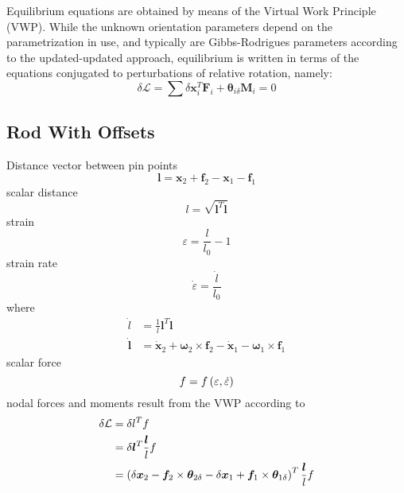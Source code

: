 \documentclass[10pt,fleqn,subeqn]{report}
\newcommand{\T}[1]{\bm{#1}}
\begin{document}
Equilibrium equations are obtained by means of the Virtual Work
Principle (VWP).
While the unknown orientation parameters depend on the parametrization 
in use, and typically are Gibbs-Rodrigues parameters according 
to the updated-updated approach, equilibrium is written in terms
of the equations conjugated to perturbations of relative rotation,
namely:
\begin{equation}
	\delta\mathcal{L} = \sum \delta\T{x}_i^T \T{F}_i
	+ \T{\theta}_{i\delta} \T{M}_i = 0
\end{equation}

\subsection{Rod With Offsets}
Distance vector between pin points
\begin{equation}
	\T{l} = \T{x}_2 + \T{f}_2 - \T{x}_1 - \T{f}_1
\end{equation}
scalar distance
\begin{equation}
	l = \sqrt{\T{l}^T \T{l}}
\end{equation}
strain
\begin{equation}
	\varepsilon = \frac{l}{l_0} - 1
\end{equation}
strain rate
\begin{equation}
	\dot{\varepsilon} = \frac{\dot{l}}{l_0}
\end{equation}
where
\begin{subequations}
\begin{align}
	\dot{l} &= \frac{1}{l} \T{l}^T \dot{\T{l}} \\
	\dot{\T{l}} &= \dot{\T{x}}_2 + \T{\omega}_2 \times \T{f}_2
		- \dot{\T{x}}_1 - \T{\omega}_1 \times \T{f}_1
\end{align}
\end{subequations}
scalar force
\begin{equation}
	f = f\left( \varepsilon, \dot{\varepsilon} \right)
\end{equation}
nodal forces and moments result from the VWP according to
\begin{subequations}
\begin{align}
	\delta \mathcal{L} &= \delta l^T f \\
	&= \delta\T{l}^T \frac{\T{l}}{l} f \\
	&= \plbr{
		\delta\T{x}_2
		- \T{f}_2 \times \T{\theta}_{2\delta}
		- \delta\T{x}_1
		+ \T{f}_1 \times \T{\theta}_{1\delta}
	}^T \frac{\T{l}}{l} f
\end{align}
\end{subequations}
\end{document}
